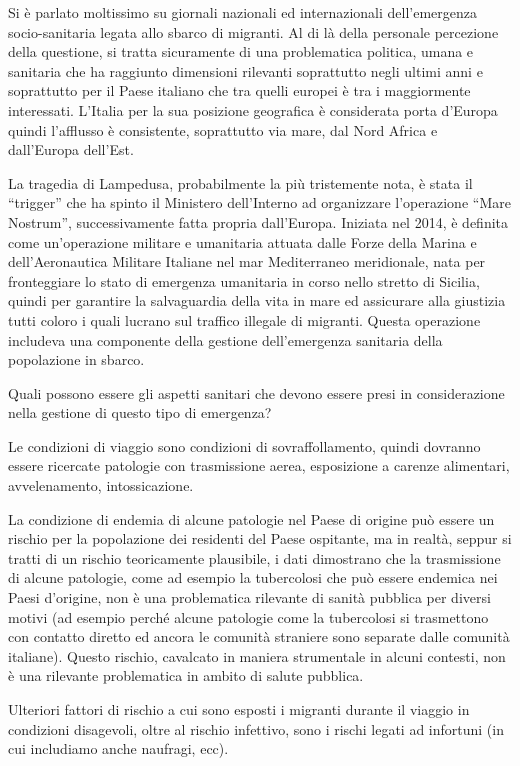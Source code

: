 \documentclass[]{article}
\begin{document}
Si è parlato moltissimo su giornali nazionali ed internazionali
dell'emergenza socio-sanitaria legata allo sbarco di migranti. Al di là
della personale percezione della questione, si tratta sicuramente di una
problematica politica, umana e sanitaria che ha raggiunto dimensioni
rilevanti soprattutto negli ultimi anni e soprattutto per il Paese
italiano che tra quelli europei è tra i maggiormente interessati.
L'Italia per la sua posizione geografica è considerata porta d'Europa
quindi l'afflusso è consistente, soprattutto via mare, dal Nord Africa e
dall'Europa dell'Est.

La tragedia di Lampedusa, probabilmente la più tristemente nota, è stata
il ``trigger'' che ha spinto il Ministero dell'Interno ad organizzare
l'operazione ``Mare Nostrum'', successivamente fatta propria
dall'Europa. Iniziata nel 2014, è definita come un'operazione militare e
umanitaria attuata dalle Forze della Marina e dell'Aeronautica Militare
Italiane nel mar Mediterraneo meridionale, nata per fronteggiare lo
stato di emergenza umanitaria in corso nello stretto di Sicilia, quindi
per garantire la salvaguardia della vita in mare ed assicurare alla
giustizia tutti coloro i quali lucrano sul traffico illegale di
migranti. Questa operazione includeva una componente della gestione
dell'emergenza sanitaria della popolazione in sbarco.

Quali possono essere gli aspetti sanitari che devono essere presi in
considerazione nella gestione di questo tipo di emergenza?

Le condizioni di viaggio sono condizioni di sovraffollamento, quindi
dovranno essere ricercate patologie con trasmissione aerea, esposizione
a carenze alimentari, avvelenamento, intossicazione.

La condizione di endemia di alcune patologie nel Paese di origine può
essere un rischio per la popolazione dei residenti del Paese ospitante,
ma in realtà, seppur si tratti di un rischio teoricamente plausibile, i
dati dimostrano che la trasmissione di alcune patologie, come ad esempio
la tubercolosi che può essere endemica nei Paesi d'origine, non è una
problematica rilevante di sanità pubblica per diversi motivi (ad esempio
perché alcune patologie come la tubercolosi si trasmettono con contatto
diretto ed ancora le comunità straniere sono separate dalle comunità
italiane). Questo rischio, cavalcato in maniera strumentale in alcuni
contesti, non è una rilevante problematica in ambito di salute pubblica.

Ulteriori fattori di rischio a cui sono esposti i migranti durante il
viaggio in condizioni disagevoli, oltre al rischio infettivo, sono i
rischi legati ad infortuni (in cui includiamo anche naufragi, ecc).
\end{document}
